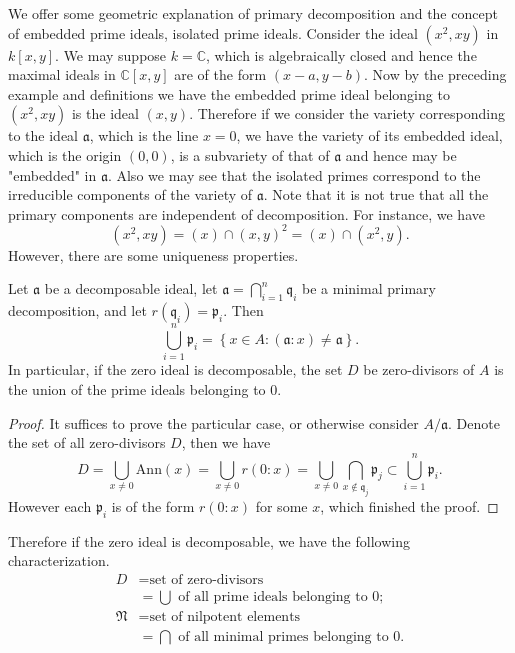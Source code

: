 We offer some geometric explanation of primary decomposition and the concept of embedded prime ideals, isolated prime ideals. Consider the ideal $(x^2,xy)$ in $k[x,y]$. We may suppose $k=\mathbb{C}$, which is algebraically closed and hence the maximal ideals in $\mathbb{C}[x,y]$ are of the form $(x-a,y-b)$. Now by the preceding example and definitions we have the embedded prime ideal belonging to $(x^2,xy)$ is the ideal $(x,y)$. Therefore if we consider the variety corresponding to the ideal $\mathfrak{a}$, which is the line $x=0$, we have the variety of its embedded ideal, which is the origin $(0,0)$, is a subvariety of that of $\mathfrak{a}$ and hence may be "embedded" in $\mathfrak{a}$. Also we may see that the isolated primes correspond to the irreducible components of the variety of $\mathfrak{a}$. Note that it is not true that all the primary components are independent of decomposition. For instance, we have 
$$
\left( x^2,xy \right) =\left( x \right) \cap \left( x,y \right) ^2=\left( x \right) \cap \left( x^2,y \right) .
$$
However, there are some uniqueness properties.
\begin{proposition}
Let $\mathfrak{a}$ be a decomposable ideal, let $\mathfrak{a}=\bigcap_{i=1}^n\mathfrak{q}_i$ be a minimal primary decomposition, and let $r(\mathfrak{q}_i)=\mathfrak{p}_i$. Then 
$$
\bigcup_{i=1}^n{\mathfrak{p} _i}=\left\{ x\in A:\left( \mathfrak{a} :x \right) \ne \mathfrak{a} \right\} .
$$
In particular, if the zero ideal is decomposable, the set $D$ be zero-divisors of $A$ is the union of the prime ideals belonging to $0$.
\end{proposition}
\begin{proof}
It suffices to prove the particular case, or otherwise consider $A/\mathfrak{a}$. Denote the set of all zero-divisors $D$, then we have 
$$
D=\bigcup_{x\ne 0}{\mathrm{Ann}\left( x \right)}=\bigcup_{x\ne 0}{r\left( 0:x \right)}=\bigcup_{x\ne 0}{\bigcap_{x\notin \mathfrak{q} _j}{\mathfrak{p} _j}}\subset \bigcup_{i=1}^n{\mathfrak{p} _i}.
$$
However each $\mathfrak{p}_i$ is of the form $r(0:x)$ for some $x$, which finished the proof.
\end{proof}
Therefore if the zero ideal is decomposable, we have the following characterization.
$$
\begin{aligned}
D & = \text{set of zero-divisors}
\\
& = \bigcup\text{ of all prime ideals belonging to }0;
\\
\mathfrak{N} & = \text{set of nilpotent elements}
\\
& = \bigcap\text{ of all minimal primes belonging to }0.
\end{aligned}
$$
